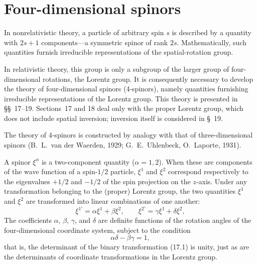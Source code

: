 
\section{Four-dimensional spinors}

In nonrelativistic theory, a particle of arbitrary spin $s$ is described by a quantity with $2s+1$ components---a symmetric spinor of rank $2s$. Mathematically, such quantities furnish irreducible representations of the spatial-rotation group.

In relativistic theory, this group is only a subgroup of the larger group of four-dimensional rotations, the Lorentz group. It is consequently necessary to develop the theory of four-dimensional spinors (4-spinors), namely quantities furnishing irreducible representations of the Lorentz group. This theory is presented in \S\S~17--19. Sections~17 and 18 deal only with the proper Lorentz group, which does not include spatial inversion; inversion itself is considered in \S~19.

The theory of 4-spinors is constructed by analogy with that of three-dimensional spinors (B.~L.~van der Waerden, 1929; G.~E.~Uhlenbeck, O.~Laporte, 1931).

A spinor $\xi^\alpha$ is a two-component quantity ($\alpha=1,2$). When these are components of the wave function of a spin-$1/2$ particle, $\xi^1$ and $\xi^2$ correspond respectively to the eigenvalues $+1/2$ and $-1/2$ of the spin projection on the $z$-axis. Under any transformation belonging to the (proper) Lorentz group, the two quantities $\xi^1$ and $\xi^2$ are transformed into linear combinations of one another:
\begin{equation}
\xi^{1'}=\alpha\xi^1+\beta\xi^2,\qquad
\xi^{2'}=\gamma\xi^1+\delta\xi^2,
\tag{17.1}
\end{equation}
The coefficients $\alpha$, $\beta$, $\gamma$, and $\delta$ are definite functions of the rotation angles of the four-dimensional coordinate system, subject to the condition
\begin{equation}
\alpha\delta-\beta\gamma=1,
\tag{17.2}
\end{equation}
that is, the determinant of the binary transformation (17.1) is unity, just as are the determinants of coordinate transformations in the Lorentz group.

